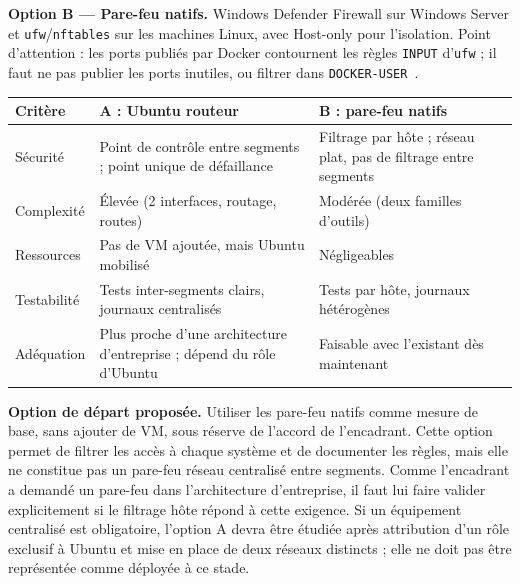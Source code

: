\documentclass[11pt,a4paper]{report}
\begin{document}
\textbf{Option B --- Pare-feu natifs.} Windows Defender Firewall sur Windows Server et \texttt{ufw}/\texttt{nftables} sur les machines Linux, avec Host-only pour l'isolation. Point d'attention : les ports publiés par Docker contournent les règles \texttt{INPUT} d'\texttt{ufw} ; il faut ne pas publier les ports inutiles, ou filtrer dans \texttt{DOCKER-USER}~\cite{docker-fw,baeldung-ufw}.

\begin{tabularx}{\textwidth}{@{}p{2.6cm}XX@{}}
\toprule\textbf{Critère} & \textbf{A : Ubuntu routeur} & \textbf{B : pare-feu natifs}\\ \midrule
Sécurité & Point de contrôle entre segments ; point unique de défaillance & Filtrage par hôte ; réseau plat, pas de filtrage entre segments\\
Complexité & Élevée (2 interfaces, routage, routes) & Modérée (deux familles d'outils)\\
Ressources & Pas de VM ajoutée, mais Ubuntu mobilisé & Négligeables\\
Testabilité & Tests inter-segments clairs, journaux centralisés & Tests par hôte, journaux hétérogènes\\
Adéquation & Plus proche d'une architecture d'entreprise ; dépend du rôle d'Ubuntu & Faisable avec l'existant dès maintenant\\
\bottomrule
\end{tabularx}

\textbf{Option de départ proposée.} Utiliser les pare-feu natifs comme mesure de base, sans ajouter de VM, sous réserve de l'accord de l'encadrant. Cette option permet de filtrer les accès à chaque système et de documenter les règles, mais elle ne constitue pas un pare-feu réseau centralisé entre segments. Comme l'encadrant a demandé un pare-feu dans l'architecture d'entreprise, il faut lui faire valider explicitement si le filtrage hôte répond à cette exigence. Si un équipement centralisé est obligatoire, l'option A devra être étudiée après attribution d'un rôle exclusif à Ubuntu et mise en place de deux réseaux distincts ; elle ne doit pas être représentée comme déployée à ce stade.
\end{document}

